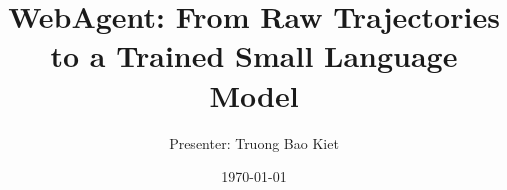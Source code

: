 \title{WebAgent: From Raw Trajectories to a Trained Small Language Model}
\author{
    Presenter: Truong Bao Kiet \\
    \vspace{0.6cm}
}
\institute{
    \vspace{0.3cm}
}
\date{\today}
\logo{\large \LaTeX{}}

